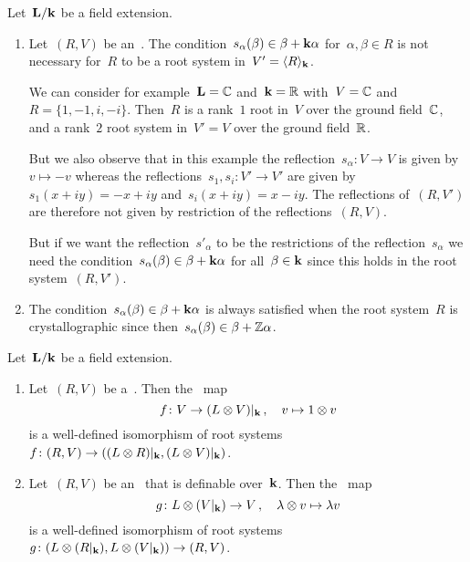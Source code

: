 \begin{remark}
  Let~$\mathbf{L}/\mathbf{k}$ be a field extension.
  \begin{enumerate}
    \item
      Let~$(R,V)$ be an~{\rootsystem{$\Lf$}}.
      The condition~$s_\alpha(\beta) \in \beta + \mathbf{k} \alpha$ for~$\alpha, \beta \in R$ is not necessary for~$R$ to be a root system in~$V' = \langle R\rangle_{\mathbf{k}}$.
      
      We can consider for example~$\mathbf{L} = \mathbb{C}$ and~$\mathbf{k} = \mathbb{R}$ with~$V = \mathbb{C}$ and~$R = \{1, -1, i, -i\}$.
      Then~$R$ is a rank~$1$ root in~$V$ over the ground field~$\mathbb{C}$, and a rank~$2$ root system in~$V' = V$ over the ground field~$\mathbb{R}$.
      
      But we also observe that in this example the reflection~$s_\alpha \colon V \to V$ is given by~$v \mapsto -v$ whereas the reflections~$s_1, s_i \colon V' \to V'$ are given by~$s_1(x+iy) = -x+iy$ and~$s_i(x+iy) = x-iy$.
      The reflections of~$(R, V')$ are therefore not given by restriction of the reflections~$(R, V)$.
      
      But if we want the reflection~$s'_\alpha$ to be the restrictions of the reflection~$s_\alpha$ we need the condition~$s_\alpha(\beta) \in \beta + \mathbf{k} \alpha$ for all~$\beta \in \mathbf{k}$ since this holds in the root system~$(R, V')$.
    \item
      The condition~$s_\alpha(\beta) \in \beta + \mathbf{k} \alpha$ is always satisfied when the root system~$R$ is crystallographic since then~$s_\alpha(\beta) \in \beta + \mathbb{Z} \alpha$.
  \end{enumerate}
\end{remark}




\begin{lemma}
  \label{natural isomorphisms for field change}
  Let~$\mathbf{L}/\mathbf{k}$ be a field extension.
  \begin{enumerate}
    \item
      Let~$(R, V)$ be a~{\rootsystem{$\kf$}}.
      Then the~{\linear{$\kf$}} map
      \[
        f
        \colon
        V
        \to
        \restrict{(L \tensor V)}{\kf}
        \,,
        \quad
        v
        \mapsto
        1 \tensor v
      \]
      is a well-defined isomorphism of root systems~$f \colon (R, V) \to (\restrict{(L \tensor R)}{\kf}, \restrict{(L \tensor V)}{\kf})$.
    \item
      Let~$(R, V)$ be an~{\rootsystem{$\Lf$}} that is definable over~$\kf$.
      Then the~{\linear{$\Lf$}} map
      \[
        g
        \colon
        L \tensor (\restrict{V}{\kf})
        \to
        V \,,
        \quad
        \lambda \tensor v
        \mapsto
        \lambda v
      \]
      is a well-defined isomorphism of root systems~$g \colon (L \tensor (\restrict{R}{\kf}), L \tensor (\restrict{V}{\kf})) \to (R, V)$.
  \end{enumerate}
\end{lemma}


